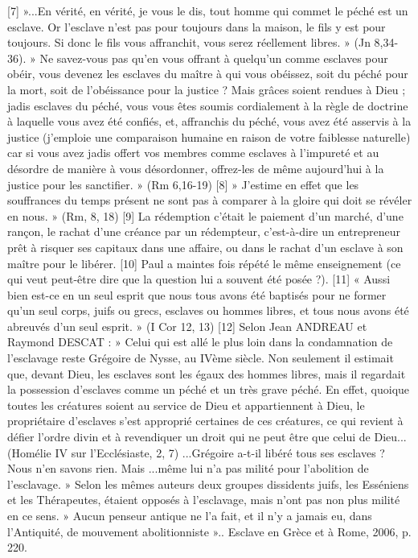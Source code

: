 [7] »...En vérité, en vérité, je vous le dis, tout homme qui commet le péché est un esclave. Or l'esclave n'est pas pour toujours dans la maison, le fils y est pour toujours. Si donc le fils vous affranchit, vous serez réellement libres. » (Jn 8,34-36). » Ne savez-vous pas qu'en vous offrant à quelqu'un comme esclaves pour obéir, vous devenez les esclaves du maître à qui vous obéissez, soit du péché pour la mort, soit de l'obéissance pour la justice ? Mais grâces soient rendues à Dieu ; jadis esclaves du péché, vous vous êtes soumis cordialement à la règle de doctrine à laquelle vous avez été confiés, et, affranchis du péché, vous avez été asservis à la justice (j'emploie une comparaison humaine en raison de votre faiblesse naturelle) car si vous avez jadis offert vos membres comme esclaves à l'impureté et au désordre de manière à vous désordonner, offrez-les de même aujourd'hui à la justice pour les sanctifier. » (Rm 6,16-19)
[8] » J'estime en effet que les souffrances du temps présent ne sont pas à comparer à la gloire qui doit se révéler en nous. » (Rm, 8, 18)
[9] La rédemption c'était le paiement d'un marché, d'une rançon, le rachat d'une créance par un rédempteur, c'est-à-dire un entrepreneur prêt à risquer ses capitaux dans une affaire, ou dans le rachat d'un esclave à son maître pour le libérer.
[10] Paul a maintes fois répété le même enseignement (ce qui veut peut-être dire que la question lui a souvent été posée ?).
[11] « Aussi bien est-ce en un seul esprit que nous tous avons été baptisés pour ne former qu'un seul corps, juifs ou grecs, esclaves ou hommes libres, et tous nous avons été abreuvés d'un seul esprit. » (I Cor 12, 13)
[12] Selon Jean ANDREAU et Raymond DESCAT : » Celui qui est allé le plus loin dans la condamnation de l'esclavage reste Grégoire de Nysse, au IVème siècle. Non seulement il estimait que, devant Dieu, les esclaves sont les égaux des hommes libres, mais il regardait la possession d'esclaves comme un péché et un très grave péché. En effet, quoique toutes les créatures soient au service de Dieu et appartiennent à Dieu, le propriétaire d'esclaves s'est approprié certaines de ces créatures, ce qui revient à défier l'ordre divin et à revendiquer un droit qui ne peut être que celui de Dieu... (Homélie IV sur l'Ecclésiaste, 2, 7) ...Grégoire a-t-il libéré tous ses esclaves ? Nous n'en savons rien. Mais ...même lui n'a pas milité pour l'abolition de l'esclavage. » Selon les mêmes auteurs deux groupes dissidents juifs, les Esséniens et les Thérapeutes, étaient opposés à l'esclavage, mais n'ont pas non plus milité en ce sens. » Aucun penseur antique ne l'a fait, et il n'y a jamais eu, dans l'Antiquité, de mouvement abolitionniste ».. Esclave en Grèce et à Rome, 2006, p. 220.
